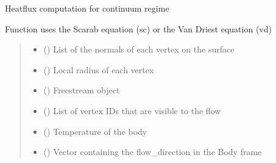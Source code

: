 \documentclass[letterpaper,10pt,english]{sphinxmanual}
\begin{document}

\begin{fulllineitems}
\label{\detokenize{modules:aerothermo.aerothermodynamics_module_continuum}}
\pysigstartsignatures
{}
\pysigstopsignatures
\sphinxAtStartPar
Heatflux computation for continuum regime

\sphinxAtStartPar
Function uses the Scarab equation (sc) or the Van Driest equation (vd)
\begin{quote}\begin{description}
\begin{itemize}
\item {} 
\sphinxAtStartPar
{} () \textendash{} List of the normals of each vertex on the surface

\item {} 
\sphinxAtStartPar
{} () \textendash{} Local radius of each vertex

\item {} 
\sphinxAtStartPar
{} () \textendash{} Freestream object

\item {} 
\sphinxAtStartPar
{} () \textendash{} List of vertex IDs that are visible to the flow

\item {} 
\sphinxAtStartPar
{} () \textendash{} Temperature of the body

\item {} 
\sphinxAtStartPar
{} () \textendash{} Vector containing the flow\_direction in the Body frame


\end{itemize}
\end{description}
\end{quote}
\end{fulllineitems}
\end{document}
